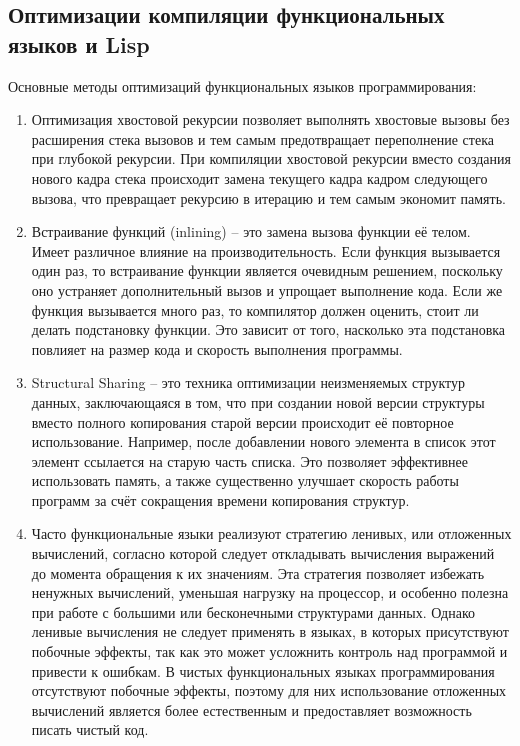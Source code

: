 \subsection{Оптимизации компиляции функциональных языков и Lisp}

Основные методы оптимизаций функциональных языков программирования:

\begin{enumerate}
\item Оптимизация хвостовой рекурсии позволяет выполнять хвостовые вызовы без расширения стека вызовов и тем самым предотвращает переполнение стека при глубокой рекурсии. При компиляции хвостовой рекурсии вместо создания нового кадра стека происходит замена текущего кадра кадром следующего вызова, что превращает рекурсию в итерацию и тем самым экономит память.
\item Встраивание функций (inlining) -- это замена вызова функции её телом. Имеет различное влияние на производительность. Если функция вызывается один раз, то встраивание функции является очевидным решением, поскольку оно устраняет дополнительный вызов и упрощает выполнение кода. Если же функция вызывается много раз, то компилятор должен оценить, стоит ли делать подстановку функции. Это зависит от того, насколько эта подстановка повлияет на размер кода и скорость выполнения программы.
\item Structural Sharing -- это техника оптимизации неизменяемых структур данных, заключающаяся в том, что при создании новой версии структуры вместо полного копирования старой версии происходит её повторное использование. Например, после добавлении нового элемента в список этот элемент ссылается на старую часть списка. Это позволяет эффективнее использовать память, а также существенно улучшает скорость работы программ за счёт сокращения времени копирования структур.
\item Часто функциональные языки реализуют стратегию ленивых, или отложенных вычислений, согласно которой следует откладывать вычисления выражений до момента обращения к их значениям. Эта стратегия позволяет избежать ненужных вычислений, уменьшая нагрузку на процессор, и особенно полезна при работе с большими или бесконечными структурами данных. Однако ленивые вычисления не следует применять в языках, в которых присутствуют побочные эффекты, так как это может усложнить контроль над программой и привести к ошибкам. В чистых функциональных языках программирования отсутствуют побочные эффекты, поэтому для них использование отложенных вычислений является более естественным и предоставляет возможность писать чистый код.

\end{enumerate}
